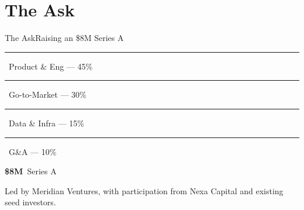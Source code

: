 \section{The Ask}

\begin{frame}{The Ask}{Raising an \$8M Series A}

  \centering

  \vspace{0.35cm}

  \begin{minipage}{0.23\textwidth}\centering
    \textcolor{accentMint}{\rule{0.28cm}{0.28cm}}\ {\small Product \& Eng --- 45\%}
  \end{minipage}
  \begin{minipage}{0.23\textwidth}\centering
    \textcolor{accentViolet}{\rule{0.28cm}{0.28cm}}\ {\small Go-to-Market --- 30\%}
  \end{minipage}
  \begin{minipage}{0.25\textwidth}\centering
    \textcolor{accentMint!45!accentViolet}{\rule{0.28cm}{0.28cm}}\ {\small Data \& Infra --- 15\%}
  \end{minipage}
  \begin{minipage}{0.2\textwidth}\centering
    \textcolor{textMuted!60}{\rule{0.28cm}{0.28cm}}\ {\small G\&A --- 10\%}
  \end{minipage}
  \par

  \vspace{0.7cm}

  {\Large\textcolor{textLight}{\textbf{\$8M}}\ \textcolor{accentMint}{Series A}}\par
  \vspace{0.15cm}
  {\small\textcolor{textMuted}{Led by Meridian Ventures, with participation from Nexa Capital and existing seed investors.}}

\end{frame}


